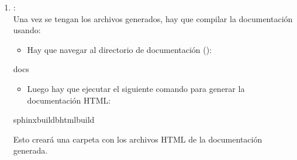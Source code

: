 \documentclass[a4paper,10pt,oneside,spanish,openany]{sphinxmanual}
\begin{document}
\begin{enumerate}
\begin{itemize}
\item {} 
\sphinxAtStartPar
{}: Genera un archivo separado para cada módulo detectado en lugar de consolidar toda la documentación en un único archivo.

\item {} 
\sphinxAtStartPar
{}: Configura la extensión de los archivos generados como . Si esta opción no se especifica, el valor predeterminado es .

\end{itemize}

\sphinxAtStartPar
Al ejecutar el comando sphinx\sphinxhyphen{}apidoc, en nuestro caso los archivos generados son:
\begin{itemize}
\item {} 
\sphinxAtStartPar
math\_operations

\item {} 
\sphinxAtStartPar
modules

\end{itemize}

\item {} 
\sphinxAtStartPar
{}:\\
Una vez se tengan los archivos generados, hay que compilar la documentación usando:
\begin{itemize}
\item {} 
\sphinxAtStartPar
Hay que navegar al directorio de documentación ():

\end{itemize}

\begin{sphinxVerbatim}[commandchars=\\\{\}]
docs
\end{sphinxVerbatim}
\begin{itemize}
\item {} 
\sphinxAtStartPar
Luego hay que ejecutar el siguiente comando para generar la documentación HTML:

\end{itemize}

\begin{sphinxVerbatim}[commandchars=\\\{\}]
sphinx\PYGZhy{}build\PYGZhy{}bhtmlbuild
\end{sphinxVerbatim}

\sphinxAtStartPar
Esto creará una carpeta  con los archivos HTML de la documentación generada.

\end{enumerate}
\end{document}
